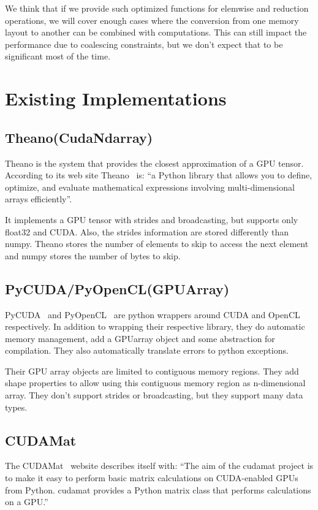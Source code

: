 \documentclass{article} %
\begin{document}
We think that if we provide such optimized functions for elemwise and reduction operations, we will cover enough cases where the conversion from one memory layout to another can be combined with computations.
This can still impact the performance due to coalescing constraints, but we don't expect that to be significant most of the time.

\section{Existing Implementations}
\subsection{Theano(CudaNdarray)}
Theano is the system that provides the closest approximation of a GPU tensor. 
According to its web site Theano~\citep{bergstra+al:2010-scipy} is: ``a Python library that allows you to define, optimize, and evaluate mathematical expressions involving multi-dimensional arrays efficiently''.

It implements a GPU tensor with strides and broadcasting, but supports only float32 and CUDA.
Also, the strides information are stored differently than numpy.
Theano stores the number of elements to skip to access the next element and numpy stores the number of bytes to skip.

\subsection{PyCUDA/PyOpenCL(GPUArray)}
PyCUDA~\citep{kloeckner_pycuda_2009} and PyOpenCL~\citep{kloeckner_pycuda_2009} are python wrappers around CUDA and OpenCL respectively. 
In addition to wrapping their respective library, they do automatic memory management, add a GPUarray object and some abstraction for compilation. 
They also automatically translate errors to python exceptions.

Their GPU array objects are limited to contiguous memory regions.
They add shape properties to allow using this contiguous memory region as n-dimensional array.
They don't support strides or broadcasting, but they support many data types.

\subsection{CUDAMat}
The CUDAMat~\citep{cudamat-TR2009} website describes itself with: ``The aim of the cudamat project is to make it easy to perform basic matrix calculations on CUDA-enabled GPUs from Python. cudamat provides a Python matrix class that performs calculations on a GPU.''
\end{document}
